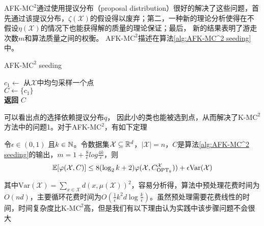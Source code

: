 AFK-M$\text{C}^2$\cite{bachem2016fast}通过使用提议分布（proposal distribution）很好的解决了这些问题，首先通过该提议分布，$\zeta(\mathcal{X})$的假设得以废弃；第二，一种新的理论分析使得在不假设$\eta(\mathcal{X})$的情况下也能获得解的质量的理论保证；最后， 新的结果表明了游走次数$m$和算法质量之间的权衡。 AFK-M$\text{C}^2$描述在算法\ref{alg:AFK-MC^2 seeding}中。
\begin{algorithm}
    \SetNoFillComment
    \caption{AFK-M$\text{C}^2$ seeding}\label{alg:AFK-MC^2 seeding}
    $c_1 \gets $ 从$\mathcal{X}$中均匀采样一个点 \\
    $C \gets \{c_1\}$ \\
    \textbf{返回} $C$
\end{algorithm}
可以看出点的选择依赖提议分布$q$， 因此小的类也能被选到点，从而解决了K-M$\text{C}^2$方法中的问题1。对于AFK-M$\text{C}^2$，有如下定理
\begin{theorem}
    \label{theo:AFKmc^2 performance}
    令$\epsilon \in (0,1)$ 且$k \in \mathbb{N}$。令数据集$\mathcal{X} \subseteq \mathbb{R}^d$，$|\mathcal{X}| = n$，$C$是算法\ref{alg:AFK-MC^2 seeding}的输出，$m = 1+\frac{8}{\epsilon}log \frac{4k}{\epsilon}$，则
    \begin{equation*}
    \mathbb{E}[\varphi(\mathcal{X},C)]\leq 8(\log_{2}k+2)\varphi(\mathcal{X},C_{\text{OPT}_k}^{\mathcal{X}})) + \epsilon\text{Var}(\mathcal{X})
    \end{equation*}
\end{theorem}
其中$\text{Var}(\mathcal{X})=\sum_{x \in  \mathcal{X}}d(x,\mu(\mathcal{X}))^2$，容易分析得，算法中预处理花费时间为$O(nd)$，主要循环花费时间为$O(\frac{1}{\epsilon}k^2 d\log \frac{k}{\epsilon})$。虽然预处理需要花费线性的时间，时间复杂度比K-M$\text{C}^2$高，但是我们有以下理由认为实践中该步骤问题不会很大
